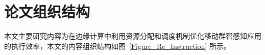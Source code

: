 




\section{论文组织结构}



本文主要研究内容为在边缘计算中利用资源分配和调度机制优化移动群智感知应用的执行效率，本文的内容组织结构如图~\ref{Figure_Re_Instruction} 所示。

